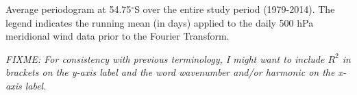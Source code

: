 \label{fig:fourier_spectrum}
Average periodogram at 54.75$^{\circ}$S over the entire study period (1979-2014). The legend indicates the running mean (in days) applied to the daily 500 hPa meridional wind data prior to the Fourier Transform. 

\textit{FIXME: For consistency with previous terminology, I might want to include $R^2$ in brackets on the y-axis label and the word wavenumber and/or harmonic on the x-axis label.}

